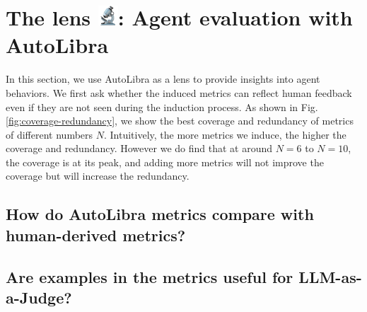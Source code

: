 \section{The lens \protect\includegraphics[height=1em]{figs/microscope.png}: Agent evaluation with AutoLibra}
\label{sec:lens}



In this section, we use AutoLibra as a lens to provide insights into agent behaviors. We first ask whether 
the induced metrics can reflect human feedback even if they are not seen during the induction process.
As shown in Fig. \ref{fig:coverage-redundancy},
we show the best coverage and redundancy of metrics of different numbers $N$. 
Intuitively, the more metrics we induce, the higher the coverage and redundancy. However we do find that
at around $N=6$ to $N=10$, the coverage is at its peak, and adding more metrics will not improve the coverage
but will increase the redundancy. 



\subsection{How do AutoLibra metrics compare with human-derived metrics?}



\subsection{Are examples in the metrics useful for LLM-as-a-Judge?}

